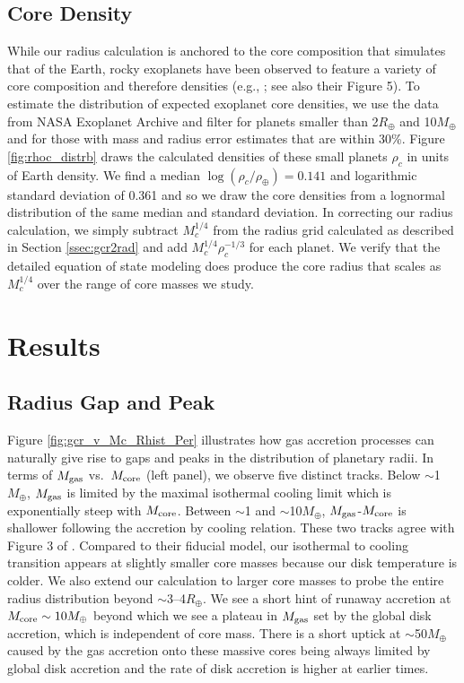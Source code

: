 \documentclass[twocolumn]{aastex631}
\begin{document}
\subsection{Core Density}
\label{ssec:core_rho}
While our radius calculation is anchored to the core composition that simulates that of the Earth, rocky exoplanets have been observed to feature a variety of core composition and therefore densities (e.g., \citealt{Zeng19}; see also \citealt{Rodriguez-Martinez22} their Figure 5). To estimate the distribution of expected exoplanet core densities, we use the data from NASA Exoplanet Archive and filter for planets smaller than 2$R_\oplus$ and 10$M_\oplus$ and for those with mass and radius error estimates that are within 30\%. Figure \ref{fig:rhoc_distrb} draws the calculated densities of these small planets $\rho_c$ in units of Earth density. We find a median $\log(\rho_c/\rho_\oplus) = 0.141$ and logarithmic standard deviation of 0.361 and so we draw the core densities from a lognormal distribution of the same median and standard deviation. In correcting our radius calculation, we simply subtract $M_c^{1/4}$ from the radius grid calculated as described in Section \ref{ssec:gcr2rad} and add $M_c^{1/4} \rho_c^{-1/3}$ for each planet. We verify that the detailed equation of state modeling does produce the core radius that scales as $M_c^{1/4}$ over the range of core masses we study.

\section{Results}
\label{sec:results}

\subsection{Radius Gap and Peak}

Figure \ref{fig:gcr_v_Mc_Rhist_Per} illustrates how gas accretion processes can naturally give rise to gaps and peaks in the distribution of planetary radii. In terms of $M_{\rm gas}$ vs.~$M_{\rm core}$ (left panel), we observe five distinct tracks. Below $\sim$1$M_\oplus$, $M_{\rm gas}$ is limited by the maximal isothermal cooling limit which is exponentially steep with $M_{\rm core}$. Between $\sim$1 and $\sim$10$M_\oplus$, $M_{\rm gas}$-$M_{\rm core}$ is shallower following the accretion by cooling relation. 
These two tracks agree with Figure 3 of \citet{Lee21}. Compared to their fiducial model, our isothermal to cooling transition appears at slightly smaller core masses because our disk temperature is colder. We also extend our calculation to larger core masses to probe the entire radius distribution beyond $\sim$3--4$R_\oplus$. 
We see a short hint of runaway accretion at $M_{\rm core} \sim 10 M_\oplus$ beyond which we see a plateau in $M_{\rm gas}$ set by the global disk accretion, which is independent of core mass. There is a short uptick at $\sim$50$M_\oplus$ caused by the gas accretion onto these massive cores being always limited by global disk accretion and the rate of disk accretion is higher at earlier times. 
\end{document}
